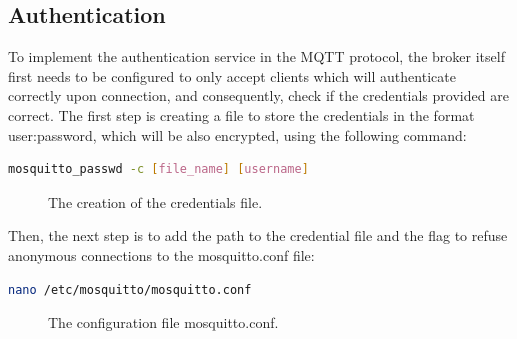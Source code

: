 \documentclass[target=bach,aauheader=,style=]{thud}
\begin{document}
\subsection{Authentication}
To implement the authentication service in the MQTT protocol, the broker itself first needs to be configured to only accept clients which will authenticate correctly upon connection, and consequently, check if the credentials provided are correct.
The first step is creating a file to store the credentials in the format user:password, which will be also encrypted, using the following command:

\begin{lstlisting}[language=bash,style=bash]
		mosquitto_passwd -c [file_name] [username]
\end{lstlisting}
\begin{figure}[h!]
	\centering
	\caption{The creation of the credentials file.}
	\label{fig:passwd}
\end{figure}

Then, the next step is to add the path to the credential file and the flag to refuse anonymous connections to the mosquitto.conf file:
\begin{lstlisting}[language=bash,style=bash]
		nano /etc/mosquitto/mosquitto.conf
\end{lstlisting}
\begin{figure}[h!]
	\centering
	\caption{The configuration file mosquitto.conf.}
	\label{fig:conf1}
\end{figure}
\newpage
\end{document}

